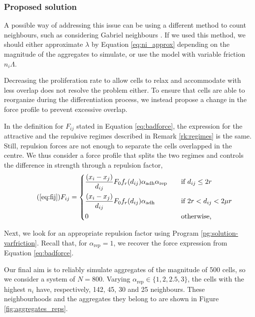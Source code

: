 \subsubsection*{Proposed solution}

A possible way of addressing this issue can be using a different method to count neighbours, such as considering Gabriel neighbours \parencite{Oriola_2022}. If we used this method, we should either approximate $\lambda$ by Equation \ref{eq:ni_approx} depending on the magnitude of the aggregates to simulate, or use the model with variable friction $n_i \Lambda$.

Decreasing the proliferation rate to allow cells to relax and accommodate with less overlap does not resolve the problem either. To ensure that cells are able to reorganize during the differentiation process, we instead propose a change in the force profile to prevent excessive overlap.

In the definition for $F_{ij}$ stated in Equation \ref{eq:badforce}, the expression for the attractive and the repulsive regimes described in Remark \ref{rk:regimes} is the same. Still, repulsion forces are not enough to separate the cells overlapped in the centre. We thus consider a force profile that splits the two regimes and controls the difference in strength through a repulsion factor,
\begin{equation}\tag{\ref{eq:fij}}
    F_{ij}= 
    \begin{dcases}
        \frac{(x_i-x_j)}{d_{ij}} 
        F_0 f_r(d_{ij})\alpha_\text{adh}\alpha_\text{rep}
        &\quad \text{if $d_{ij}\leq 2 r$} \\
        \frac{(x_i-x_j)}{d_{ij}}
        F_0 f_r(d_{ij}) \alpha_\text{adh}
        &\quad \text{if $2r<d_{ij}<2\mu r$} \\
        0 &\quad \text{otherwise,}
    \end{dcases}
\end{equation}

Next, we look for an appropriate repulsion factor using Program \ref{pg:solution-varfriction}. Recall that, for $\alpha_\text{rep}=1$, we recover the force expression from Equation \ref{eq:badforce}.

Our final aim is to reliably simulate aggregates of the magnitude of 500 cells, so we consider a system of $N=800$. Varying $\alpha_\text{rep}\in\{1,2,2.5,3\}$, the cells with the highest $n_i$ have, respectively, 142, 45, 30 and 25 neighbours. These neighbourhoods and the aggregates they belong to are shown in Figure \ref{fig:aggregates_reps}.

